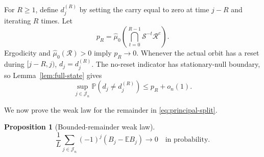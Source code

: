 \documentclass[11pt,a4paper]{amsart}
\newtheorem{proposition}[theorem]{Proposition}
\theoremstyle{definition}
\theoremstyle{remark}
\newcommand{\E}{\mathbb E}
\newcommand{\Pp}{\mathbb P}
\begin{document}
For $R\ge1$, define $d_j^{(R)}$ by setting the carry equal to zero at time
$j-R$ and iterating $R$ times.  Let
\[
 p_R=\widehat\mu_0\left(
 \bigcap_{t=0}^{R-1}\mathcal S^{-t}\mathcal R^c\right).
\]
Ergodicity and $\widehat\mu_0(\mathcal R)>0$ imply $p_R\to0$.  Whenever the
actual orbit has a reset during $[j-R,j)$, $d_j=d_j^{(R)}$.  The no-reset
indicator has stationary-null boundary, so Lemma~\ref{lem:full-state} gives
\begin{equation}\label{eq:carry-coupling-prob}
 \sup_{j\in\mathcal J_n}\Pp(d_j\ne d_j^{(R)})\le p_R+o_n(1).
\end{equation}

We now prove the weak law for the remainder in
\eqref{eq:principal-split}.

\begin{proposition}[Bounded-remainder weak law]\label{prop:remainder}
\begin{equation}\label{eq:remainder-WLLN}
 \frac1L\sum_{j\in\mathcal J_n}(-1)^j
 (B_j-\E B_j)\longrightarrow0
 \quad\text{in probability}.
\end{equation}
\end{proposition}
\end{document}
